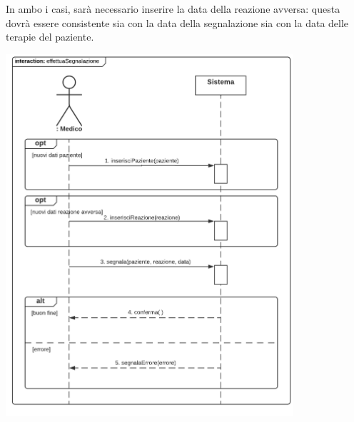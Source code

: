 \documentclass{article}
\begin{document}
\newpage
In ambo i casi, sarà necessario inserire la data della reazione avversa: questa dovrà essere consistente sia con la data della segnalazione sia con la data delle terapie del paziente.
\begin{center}
    \includegraphics[width=0.80\textwidth]{pictures/SDMedico1_Segnalazione.png}
\end{center}

\newpage
\end{document}
